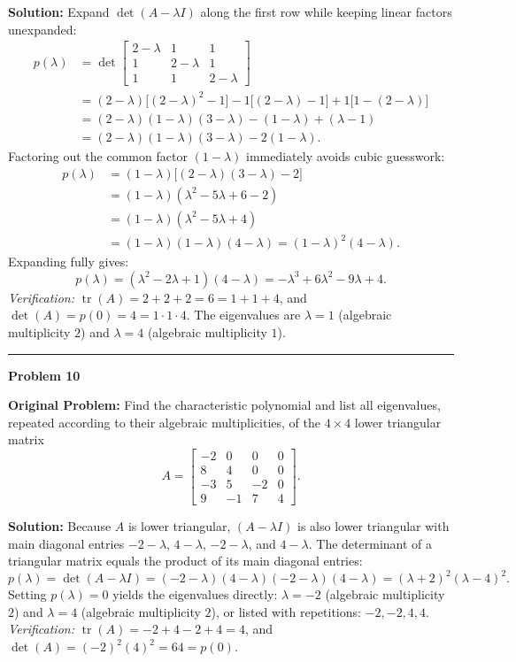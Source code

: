 \documentclass[11pt, letterpaper]{article}
\theoremstyle{definition}
\theoremstyle{remark}
\begin{document}
\textbf{Solution:} Expand $\det(A - \lambda I)$ along the first row while keeping linear factors unexpanded:
\begin{align*}
p(\lambda) &= \det\begin{bmatrix} 2 - \lambda & 1 & 1 \\ 1 & 2 - \lambda & 1 \\ 1 & 1 & 2 - \lambda \end{bmatrix} \\
&= (2 - \lambda)\big[(2 - \lambda)^2 - 1\big] - 1\big[(2 - \lambda) - 1\big] + 1\big[1 - (2 - \lambda)\big] \\
&= (2 - \lambda)(1 - \lambda)(3 - \lambda) - (1 - \lambda) + (\lambda - 1) \\
&= (2 - \lambda)(1 - \lambda)(3 - \lambda) - 2(1 - \lambda).
\end{align*}
Factoring out the common factor $(1 - \lambda)$ immediately avoids cubic guesswork:
\begin{align*}
p(\lambda) &= (1 - \lambda)\big[(2 - \lambda)(3 - \lambda) - 2\big] \\
&= (1 - \lambda)(\lambda^2 - 5\lambda + 6 - 2) \\
&= (1 - \lambda)(\lambda^2 - 5\lambda + 4) \\
&= (1 - \lambda)(1 - \lambda)(4 - \lambda) = (1 - \lambda)^2(4 - \lambda).
\end{align*}
Expanding fully gives:
\[
p(\lambda) = (\lambda^2 - 2\lambda + 1)(4 - \lambda) = -\lambda^3 + 6\lambda^2 - 9\lambda + 4.
\]
\textit{Verification:} $\operatorname{tr}(A) = 2 + 2 + 2 = 6 = 1 + 1 + 4$, and $\det(A) = p(0) = 4 = 1 \cdot 1 \cdot 4$.
The eigenvalues are $\lambda = 1$ (algebraic multiplicity $2$) and $\lambda = 4$ (algebraic multiplicity $1$).

\noindent\rule{\textwidth}{0.4pt}

\noindent\textbf{Problem 10}

\textbf{Original Problem:} Find the characteristic polynomial and list all eigenvalues, repeated according to their algebraic multiplicities, of the $4 \times 4$ lower triangular matrix
\[
A = \begin{bmatrix}
-2 & 0 & 0 & 0 \\
8 & 4 & 0 & 0 \\
-3 & 5 & -2 & 0 \\
9 & -1 & 7 & 4
\end{bmatrix}.
\]

\textbf{Solution:} Because $A$ is lower triangular, $(A - \lambda I)$ is also lower triangular with main diagonal entries $-2 - \lambda$, $4 - \lambda$, $-2 - \lambda$, and $4 - \lambda$. The determinant of a triangular matrix equals the product of its main diagonal entries:
\[
p(\lambda) = \det(A - \lambda I) = (-2 - \lambda)(4 - \lambda)(-2 - \lambda)(4 - \lambda) = (\lambda + 2)^2(\lambda - 4)^2.
\]
Setting $p(\lambda) = 0$ yields the eigenvalues directly: $\lambda = -2$ (algebraic multiplicity $2$) and $\lambda = 4$ (algebraic multiplicity $2$), or listed with repetitions: $-2, -2, 4, 4$.
\textit{Verification:} $\operatorname{tr}(A) = -2 + 4 - 2 + 4 = 4$, and $\det(A) = (-2)^2(4)^2 = 64 = p(0)$.
\end{document}
